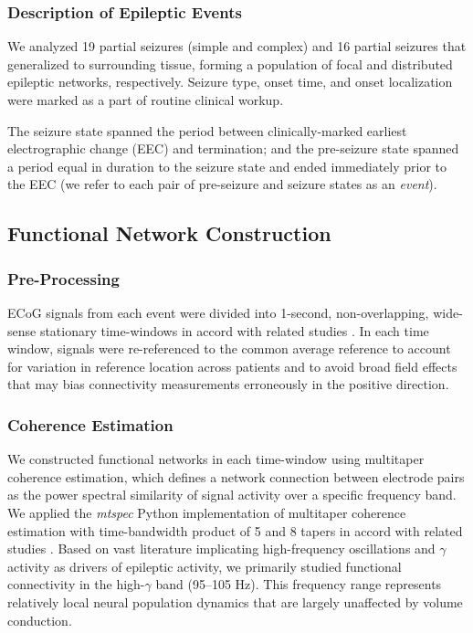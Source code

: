 \subsubsection{Description of Epileptic Events}
We analyzed 19 partial seizures (simple and complex) and 16 partial seizures that generalized to surrounding tissue, forming a population of focal and distributed epileptic networks, respectively. Seizure type, onset time, and onset localization were marked as a part of routine clinical workup.

The seizure state spanned the period between clinically-marked earliest electrographic change (EEC) \cite{litt2001epileptic} and termination; and the pre-seizure state spanned a period equal in duration to the seizure state and ended immediately prior to the EEC (we refer to each pair of pre-seizure and seizure states as an \textit{event}).

\subsection{Functional Network Construction}
\subsubsection{Pre-Processing}
ECoG signals from each event were divided into 1-second, non-overlapping, wide-sense stationary time-windows in accord with related studies \cite{kramer2010coalescence}. In each time window, signals were re-referenced to the common average reference \cite{kramer2010coalescence, towle1999electrocorticographic} to account for variation in reference location across patients and to avoid broad field effects that may bias connectivity measurements erroneously in the positive direction.

\subsubsection{Coherence Estimation}
We constructed functional networks in each time-window using multitaper coherence estimation, which defines a network connection between electrode pairs as the power spectral similarity of signal activity over a specific frequency band. We applied the \textit{mtspec} Python implementation \cite{prieto2009fortran} of multitaper coherence estimation with time-bandwidth product of 5 and 8 tapers in accord with related studies \cite{kramer2011emergence}. Based on vast literature implicating high-frequency oscillations and $\gamma$ activity as drivers of epileptic activity, we primarily studied functional connectivity in the high-$\gamma$ band (95--105 Hz). This frequency range represents relatively local neural population dynamics that are largely unaffected by volume conduction.


